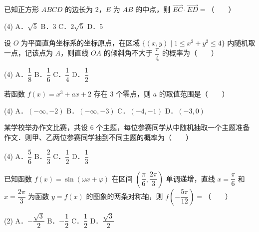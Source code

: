 \begin{question}
已知正方形 $ABCD$ 的边长为 $2$，$E$ 为 $AB$ 的中点，则 $\overrightarrow{EC}\cdot\overrightarrow{ED}=$\mbox{（　　）}

\begin{gkopts}(4)
\task A．$\sqrt5$
\task B．$3$
\task C．$2\sqrt5$
\task D．$5$
\end{gkopts}

\end{question}
\begin{question}
设 $O$ 为平面直角坐标系的坐标原点，在区域 $\{(x,y)\mid 1\leqslant x^2+y^2\leqslant4\}$ 内随机取一点，记该点为 $A$，则直线 $OA$ 的倾斜角不大于 $\dfrac\pi4$ 的概率为\mbox{（　　）}

\begin{gkopts}(4)
\task A．$\dfrac18$
\task B．$\dfrac16$
\task C．$\dfrac14$
\task D．$\dfrac12$
\end{gkopts}

\end{question}
\begin{question}
若函数 $f(x)=x^3+ax+2$ 存在 $3$ 个零点，则 $a$ 的取值范围是\mbox{（　　）}

\begin{gkopts}(4)
\task A．$(-\infty,-2)$
\task B．$(-\infty,-3)$
\task C．$(-4,-1)$
\task D．$(-3,0)$
\end{gkopts}

\end{question}
\begin{question}
某学校举办作文比赛，共设 $6$ 个主题，每位参赛同学从中随机抽取一个主题准备作文．则甲、乙两位参赛同学抽到不同主题的概率为\mbox{（　　）}

\begin{gkopts}(4)
\task A．$\dfrac56$
\task B．$\dfrac23$
\task C．$\dfrac12$
\task D．$\dfrac13$
\end{gkopts}

\end{question}
\begin{question}
已知函数 $f(x)=\sin(\omega x+\varphi)$ 在区间 $\left(\dfrac\pi6,\dfrac{2\pi}3\right)$ 单调递增，直线 $x=\dfrac\pi6$ 和 $x=\dfrac{2\pi}3$ 为函数 $y=f(x)$ 的图象的两条对称轴，则 $f\left(-\dfrac{5\pi}{12}\right)=$\mbox{（　　）}

\begin{gkopts}(2)
\task A．$-\dfrac{\sqrt3}{2}$
\task B．$-\dfrac12$
\task C．$\dfrac12$
\task D．$\dfrac{\sqrt3}{2}$
\end{gkopts}

\end{question}
